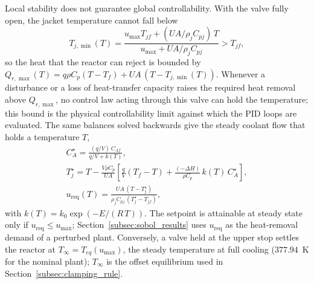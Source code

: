 \documentclass[11pt]{article}
\begin{document}
Local stability does not guarantee global controllability. With the valve fully open, the jacket temperature cannot fall below
\begin{equation}
    T_{j,\min}(T) = \frac{u_{\max} T_{jf} + (UA/\rho_j C_{pj})\,T}{u_{\max} + UA/\rho_j C_{pj}} > T_{jf},
    \label{eq:tj_min_bound}
\end{equation}
so the heat that the reactor can reject is bounded by $Q_{r,\max}(T) = q \rho C_p (T - T_f) + UA\,(T - T_{j,\min}(T))$. Whenever a disturbance or a loss of heat-transfer capacity raises the required heat removal above $Q_{r,\max}$, no control law acting through this valve can hold the temperature; this bound is the physical controllability limit against which the PID loops are evaluated. The same balances solved backwards give the steady coolant flow that holds a temperature $T$,
\begin{equation}
    \begin{gathered}
    C_A^\star = \frac{(q/V)\,C_{Af}}{q/V + k(T)}, \\
    T_j^\star = T - \frac{V\rho C_p}{UA}\!\left[\frac{q}{V}(T_f - T) + \frac{(-\Delta H)}{\rho C_p}\,k(T)\,C_A^\star\right], \\
    u_{\mathrm{req}}(T) = \frac{UA\,(T - T_j^\star)}{\rho_j C_{pj}\,(T_j^\star - T_{jf})},
    \end{gathered}
    \label{eq:u_req}
\end{equation}
with $k(T) = k_0\exp(-E/(R\,T))$. The setpoint is attainable at steady state only if $u_{\mathrm{req}} \le u_{\max}$; Section~\ref{subsec:sobol_results} uses $u_{\mathrm{req}}$ as the heat-removal demand of a perturbed plant. Conversely, a valve held at the upper stop settles the reactor at $T_\infty = T_{eq}(u_{\max})$, the steady temperature at full cooling ($377.94$~K for the nominal plant); $T_\infty$ is the offset equilibrium used in Section~\ref{subsec:clamping_rule}.
\end{document}

